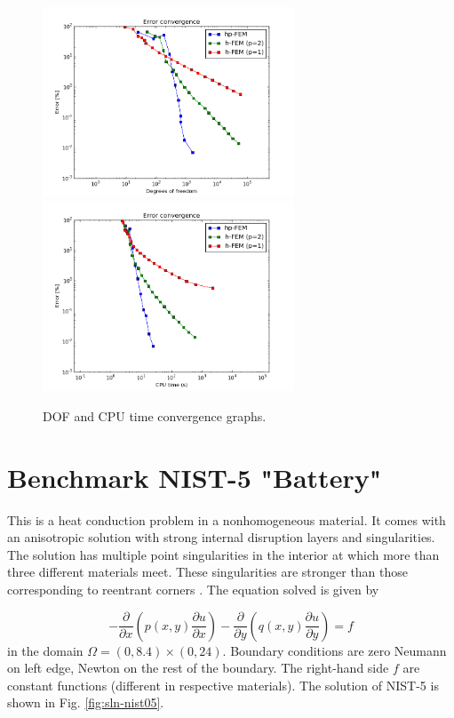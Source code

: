 \documentclass[12pt]{elsarticle}
\begin{document}
\begin{figure}[H]
\centering
\hspace{-50mm}
\includegraphics[width=7.5cm]{nist/nist-4/conv_dof_aniso.png}\ \
\hspace{-10mm}
\includegraphics[width=7.5cm]{nist/nist-4/conv_cpu_aniso.png}
\hspace{-50mm}
\caption{DOF and CPU time convergence graphs.}
\label{fig:nist-4-conv}
\end{figure}


\section{Benchmark NIST-5 "Battery"}
\label{sec:bench-5}

This is a heat conduction problem in a nonhomogeneous material.
It comes with an anisotropic solution with strong internal disruption
layers and singularities.
The solution has multiple point singularities in the interior at which
more than three different materials meet. These singularities are stronger than those
corresponding to reentrant corners \cite{demkowicz-1}.
The equation solved is given by

\begin{equation} \label{heat-conduction}
-\frac{\partial }{\partial x}\left(p(x, y)\frac{\partial u}{\partial x}\right)
-\frac{\partial }{\partial y}\left(q(x, y)\frac{\partial u}{\partial y}\right) = f
\end{equation}
in the domain $\Omega = (0, 8.4) \times (0, 24)$. Boundary conditions are zero Neumann on left edge, Newton on the rest of the boundary.
The right-hand side $f$ are constant functions (different in respective materials).
The solution of NIST-5 is shown in Fig. \ref{fig:sln-nist05}.
\end{document}
